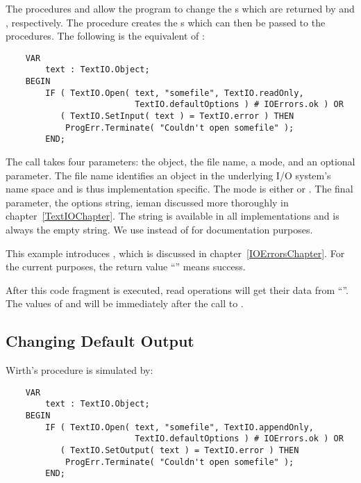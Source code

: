 The procedures  and
 allow the program to change the 
s which are returned by  and
, respectively.  The procedure 
creates the s which can then be passed to
the  procedures.  The following is the equivalent of 
:
\begin{verbatim}
    VAR
        text : TextIO.Object;
    BEGIN 
        IF ( TextIO.Open( text, "somefile", TextIO.readOnly, 
                          TextIO.defaultOptions ) # IOErrors.ok ) OR
           ( TextIO.SetInput( text ) = TextIO.error ) THEN
            ProgErr.Terminate( "Couldn't open somefile" );
        END;
\end{verbatim}

The  call takes four parameters:
the object, the file name, a mode, and an optional parameter.
The file name identifies an object in the underlying I/O system's
name space and is thus implementation specific.  The mode is
either  or .
The final parameter, the options string, ieman
discussed more
thoroughly in chapter~\ref{TextIOChapter}.  The string
 is available in all implementations
and is always the empty string.  We use 
instead of  for documentation purposes.

This example introduces , which is discussed in
chapter~\ref{IOErrorsChapter}.  For the current purposes, the return value
``'' means success.

After this code fragment is executed, read operations will
get their data from ``''.  The values
of  and  will be  immediately
after the call to .


\subsection{Changing Default Output}

Wirth's procedure  is simulated by:

\begin{verbatim}
    VAR
        text : TextIO.Object;
    BEGIN 
        IF ( TextIO.Open( text, "somefile", TextIO.appendOnly, 
                          TextIO.defaultOptions ) # IOErrors.ok ) OR
           ( TextIO.SetOutput( text ) = TextIO.error ) THEN
            ProgErr.Terminate( "Couldn't open somefile" );
        END;
\end{verbatim}

